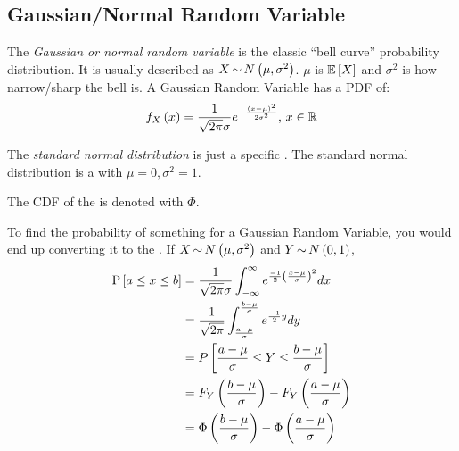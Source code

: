 	\subsection{Gaussian/Normal Random Variable} \label{subsec:Gaussian Random Variable}
		\begin{definition} \label{def:Gaussian Random Variable}
			The \emph{Gaussian or normal random variable} is the classic ``bell curve'' probability distribution.
			It is usually described as $X \operatorname{\sim} N \left( \mu, \sigma^{2} \right)$.
			$\mu$ is $\operatorname{\operatorname{\mathbb{E}}} \left[ X \right] $ and $\sigma^{2}$ is how narrow/sharp the bell is.
			A Gaussian Random Variable has a PDF of:
			\begin{equation} \label{eq:PDF of Gaussian Random Variable}
				f_{X} \left( x \right) = \frac{1}{\sqrt{2 \pi} \sigma} e^{-\frac{\left( x - \mu \right)^{2}}{2 \sigma^{2}}} \text{, } x \in \operatorname{\mathbb{R}}
			\end{equation}
		\end{definition}
		\begin{definition} \label{def:Standard Normal Distribution}
			The \emph{standard normal distribution} is just a specific .
			The standard normal distribution is a  with $\mu = 0, \sigma^{2} = 1$.
			\begin{remark} \label{rmk:CDF of Standard Normal Distribution}
				The CDF of the  is denoted with $\Phi$.
			\end{remark}
		\end{definition}
	
	To find the probability of something for a Gaussian Random Variable, you would end up converting it to the .
	If $X \operatorname{\sim} N \left( \mu, \sigma^{2} \right)$ and $Y \operatorname{\sim} N \left( 0,1 \right)$,
		\begin{equation} \label{eq:Probability of Gaussian Random Variable}
			\begin{aligned}
				\operatorname{\operatorname{P}} \left[ a \leq x \leq b \right] &= \frac{1}{\sqrt{2 \pi} \sigma} \int_{-\infty}^{\infty} e^{\frac{-1}{2} \left( \frac{x-\mu}{\sigma} \right)^{2}} dx \\
				&= \frac{1}{\sqrt{2 \pi}} \int_{\frac{a-\mu}{\sigma}}^{\frac{b-\mu}{\sigma}} e^{\frac{-1}{2}y}dy \\
				&= P \left[ \frac{a-\mu}{\sigma} \leq Y \leq \frac{b-\mu}{\sigma} \right] \\
				&= F_{Y} \left( \frac{b-\mu}{\sigma} \right) - F_{Y} \left( \frac{a-\mu}{\sigma} \right) \\
				&= \Phi \left( \frac{b-\mu}{\sigma} \right) - \Phi \left( \frac{a-\mu}{\sigma} \right) \\
			\end{aligned}
		\end{equation}
		
